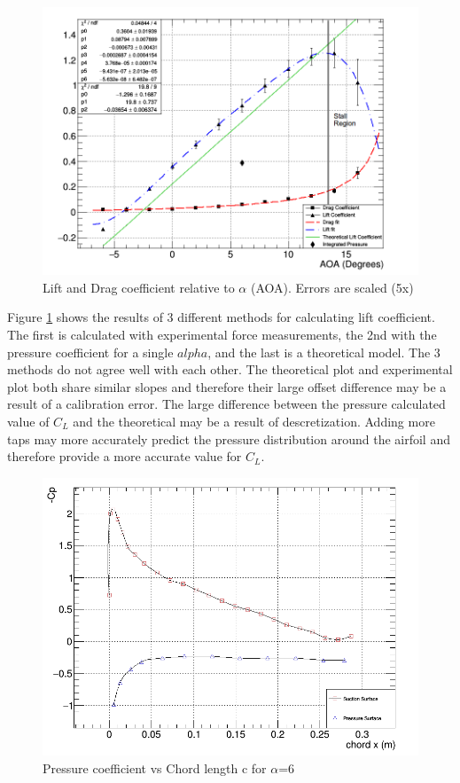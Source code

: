 \documentclass[paper=a4, fontsize=11pt, abstract=on]{scrartcl}
\numberwithin{equation}{section}		%
\numberwithin{figure}{section}			%
\numberwithin{table}{section}				%
\begin{document}
\begin{figure}[H]
\centering
\includegraphics[width=0.8\linewidth]{q1}
\caption{Lift and Drag coefficient relative to $\alpha$ (AOA). Errors are scaled (5x)}
\label{fig2}
\end{figure}

Figure \ref{fig2} shows the results of 3 different methods for calculating lift coefficient. The first is calculated with experimental force measurements, the 2nd with the pressure coefficient for a single $alpha$, and the last is a theoretical model. The 3 methods do not agree well with each other. The theoretical plot and experimental plot both share similar slopes and therefore their large offset difference may be a result of a calibration error. The large difference between the pressure calculated value of $C_L$ and the theoretical may be a result of descretization. Adding more taps may more accurately predict the pressure distribution around the airfoil and therefore provide a more accurate value for $C_L$.





\begin{figure}[H]
\centering
\includegraphics[width=0.7\linewidth]{p1}
\caption{Pressure coefficient vs Chord length c for $\alpha$=6}
\label{press}
\end{figure}
\end{document}
